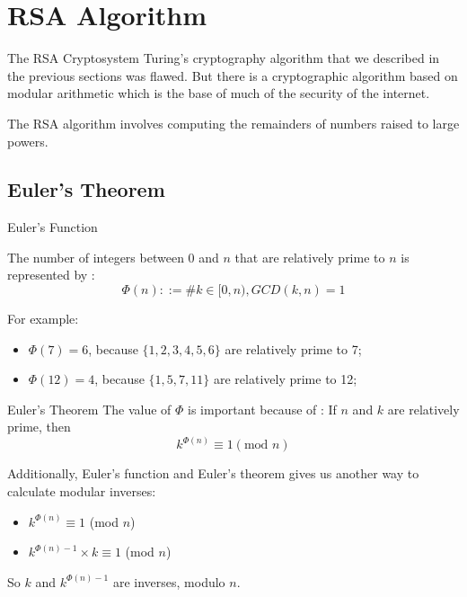 \section{RSA Algorithm}



\begin{frame}{The RSA Cryptosystem}
  Turing's cryptography algorithm that we described in the previous sections was flawed. But there is a cryptographic algorithm based on modular arithmetic which is the base of much of the security of the internet.\bigskip

  The RSA algorithm involves computing the remainders of numbers raised to large powers.
\end{frame}

\subsection{Euler's Theorem}

\begin{frame}{Euler's Function}

  The number of integers between $0$ and $n$ that are relatively prime to $n$ is represented by :
  \begin{equation*}
    \Phi(n) ::= \# k\in[0,n), GCD(k,n) = 1
  \end{equation*}
  \bigskip

  For example:
  \begin{itemize}
    \item $\Phi(7) = 6$, because $\{1,2,3,4,5,6\}$ are relatively prime to 7;
    \item $\Phi(12) = 4$, because $\{1,5,7,11\}$ are relatively prime to 12;
  \end{itemize}\bigskip
\end{frame}

\begin{frame}{Euler's Theorem}
  The value of $\Phi$ is important because of : If $n$ and $k$ are relatively prime, then
  \begin{equation*}
    k^{\Phi(n)} \equiv 1 (\text{mod } n)
  \end{equation*}\bigskip

  Additionally, Euler's function and Euler's theorem gives us another way to calculate modular inverses:
  \begin{itemize}
    \item $k^{\Phi(n)} \equiv 1$ (mod $n$)
    \item $k^{\Phi(n)-1}\times k \equiv 1$ (mod $n$)
  \end{itemize}
  So $k$ and $k^{\Phi(n)-1}$ are inverses, modulo $n$.
\end{frame}

